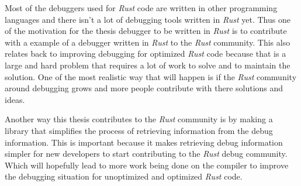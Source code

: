 Most of the debuggers used for \emph{Rust} code are written in other programming languages and there isn't a lot of debugging tools written in \emph{Rust} yet.
Thus one of the motivation for the thesis debugger to be written in \emph{Rust} is to contribute with a example of a debugger written in \emph{Rust} to the \emph{Rust} community.
This also relates back to improving debugging for optimized \emph{Rust} code because that is a large and hard problem that requires a lot of work to solve and to maintain the solution.
One of the most realistic way that will happen is if the \emph{Rust} community around debugging grows and more people contribute with there solutions and ideas.


Another way this thesis contributes to the \emph{Rust} community is by making a library that simplifies the process of retrieving information from the debug information.
This is important because it makes retrieving debug information simpler for new developers to start contributing to the \emph{Rust} debug community.
Which will hopefully lead to more work being done on the compiler to improve the debugging situation for unoptimized and  optimized \emph{Rust} code.


